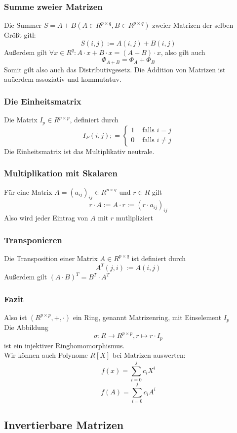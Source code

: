 \documentclass{kit}
\begin{document}
    \subsubsection{Summe zweier Matrizen}
      Die Summer $S=A+B(A\in R^{p\times q},B\in R^{p\times q})$ zweier Matrizen der selben Größt gitl:
      $$S(i,j):=A(i,j)+B(i,j)$$
      Außerdem gilt $\forall x\in R^{q}:A\cdot x+B\cdot x=(A+B)\cdot x$, also gilt auch
      $$\Phi_{A+B}=\Phi_A+\Phi_B$$
      Somit gilt also auch das Distributivgesetz. Die Addition von Matrizen ist auüerdem assoziativ und kommutatuv.
    \subsubsection{Die Einheitsmatrix}
      Die Matrix $I_p\in R^{p\times p}$, definiert durch
      $$I_P(i,j);=\begin{cases}
        1 & \text{ falls } i=j\\
        0 & \text{ falls } i\neq j
      \end{cases}$$
      Die Einheitsmatrix ist das Multiplikativ neutrale.
    \subsubsection{Multiplikation mit Skalaren}
      Für eine Matrix $A=(a_{ij})_{ij}\in R^{p\times q}$ und $r\in R$ gilt
      $$r\cdot A:=A\cdot r:=(r\cdot a_{ij})_{ij}$$
      Also wird jeder Eintrag von $A$ mit $r$ mutlipliziert
    \subsubsection{Transponieren}
      Die Transposition einer Matrix $A\in R^{p\times q}$ ist definiert durch
      $$A^T(j,i):=A(i,j)$$
      Außerdem gilt $(A\cdot B)^T=B^T\cdot A^T$
    \subsubsection{Fazit}
      Also ist $(R^{p\times p},+,\cdot)$ ein Ring, genannt Matrizenring, mit Einselement $I_p$\\
      Die Abbildung 
      $$\sigma:R\longrightarrow R^{p\times p},r\mapsto r\cdot I_p$$
      ist ein injektiver Ringhomomorphismus.\\
      Wir können auch Polynome $R[X]$ bei Matrizen auswerten: 
      $$f(x)=\sum_{i=0}^jc_iX^i$$
      $$f(A)=\sum_{i=0}^jc_iA^i$$
  \subsection{Invertierbare Matrizen}
\end{document}
